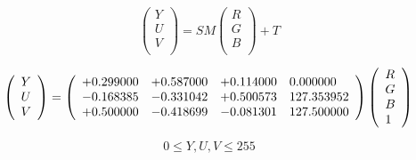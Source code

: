 \documentclass{article}
\begin{document}
\[ \left( \begin{array}{l} Y \\ U \\ V \\ \end{array} \right) = SM \left( \begin{array}{l} R \\ G \\ B \\ \end{array} \right) + T \]
\pagebreak

\[ \left( \begin{array}{l} Y \\ U \\ V \\ \end{array} \right) = \left( \begin{array}{llll} +0.299000 & +0.587000 & +0.114000 & 0.000000 \\ -0.168385 & -0.331042 & +0.500573 & 127.353952 \\ +0.500000 & -0.418699 & -0.081301 & 127.500000 \\ \end{array} \right) \left( \begin{array}{l} R \\ G \\ B \\ 1 \\ \end{array} \right) \\ \]
\pagebreak

\[ 0 \le Y, U, V \le 255 \]
\pagebreak
\end{document}
